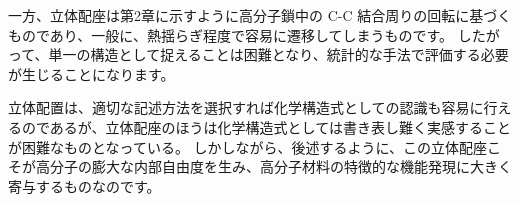 \documentclass[a4paper,11pt]{jlreq}
\begin{document}
一方、立体配座は第2章に示すように高分子鎖中の C-C 結合周りの回転に基づくものであり、一般に、熱揺らぎ程度で容易に遷移してしまうものです。
したがって、単一の構造として捉えることは困難となり、統計的な手法で評価する必要が生じることになります。

立体配置は、適切な記述方法を選択すれば化学構造式としての認識も容易に行えるのであるが、立体配座のほうは化学構造式としては書き表し難く実感することが困難なものとなっている。
しかしながら、後述するように、この立体配座こそが高分子の膨大な内部自由度を生み、高分子材料の特徴的な機能発現に大きく寄与するものなのです。
\end{document}
